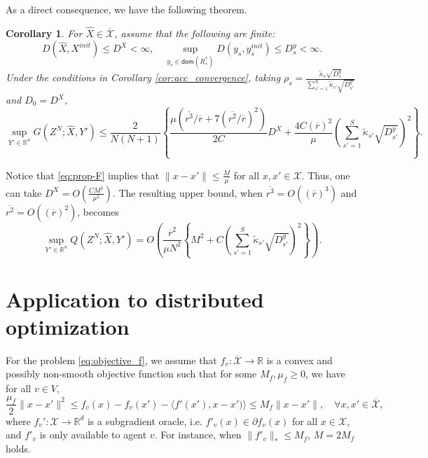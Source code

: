 \documentclass[10pt]{article}
\newcommand{\mc}{\mathcal}
\newcommand{\R}{\mathbb{R}}
\newcommand{\domain}{\mathsf{dom}}
\newtheorem{corollary}{Corollary}[section]
\begin{document}
As a direct consequence, we have the following theorem. 
\begin{corollary}\label{cor:main_acc} 
For $\widehat{X}\in \overline{\mc X}$, assume that the following are finite:
\begin{displaymath}
  D(\widehat{X},X^{init})\leq D^X<\infty,\quad  \sup_{y_s\in \domain(R^*_s)}D(y_s,y_s^{init})\leq D_s^y<\infty. 
\end{displaymath}
Under the conditions in Corollary \ref{cor:acc_convergence}, taking $\rho_s =\frac{\widetilde{\kappa}_s\sqrt{D_s^y}}{\sum_{s'=1}^S \widetilde{\kappa}_{s'}\sqrt{D_{s'}^y}}$ and $D_0 = D^X$, 
\begin{displaymath}
     \sup_{Y'\in \R^n}G(Z^N;\widehat{X},Y')  \leq \frac{2}{N(N+1)}\left\{\frac{\mu(\overline{r^3}/\overline{r} + 7(\overline{r^2}/\overline{r})^2)}{2C}D^X+ \frac{4C(\overline{r})^2}{\mu}(\sum_{s'=1}^S \widetilde{\kappa}_{s'}\sqrt{D_{s'}^y})^2 \right\}.
\end{displaymath}
\end{corollary}

Notice that \eqref{eq:prop-F} implies that $\|x-x'\|\leq \frac{M}{\mu}$ for all $x,x'\in \mc X$. Thus, one can take $D^X = O(\frac{CM^2}{\mu^2})$. The resulting upper bound, when $\overline{r^3} = O((\overline{r})^3)$ and $\overline{r^2} = O((\overline{r})^2)$, becomes 
\begin{displaymath}
     \sup_{Y'\in \R^n}Q(Z^N;\widehat{X},Y')  =O( \frac{\overline{r}^2}{\mu N^2}\left\{M^2+ C(\sum_{s'=1}^S \widetilde{\kappa}_{s'}\sqrt{D_{s'}^y})^2 \right\}).
\end{displaymath}





\section{Application to distributed optimization}\label{sec:app-do}


For the problem \eqref{eq:objective_f}, we assume that $f_v:\overline{\mc X}\to \R$ is a convex and possibly non-smooth objective function such that for some $M_f,\mu_f\geq 0$, we have for all $v\in V$, 
\begin{equation}\label{eq:prop-f}
    \frac{\mu_f}{2}\|x-x'\|^2\leq f_v(x) - f_v(x')-\langle f' (x'),x-x')\rangle\leq M_f\|x-x'\|,\quad\forall x,x'\in \overline{\mc X},
\end{equation}
where $f_v':\mc X\to \R^d$ is a subgradient oracle, i.e. $f'_v(x)\in \partial f_v(x)$ for all $x\in \mc X$, and $f'_v$ is only available to agent $v$. For instance, when $\|f'_v\|_*\leq M_f$, $M = 2M_f$ holds. 
\end{document}
